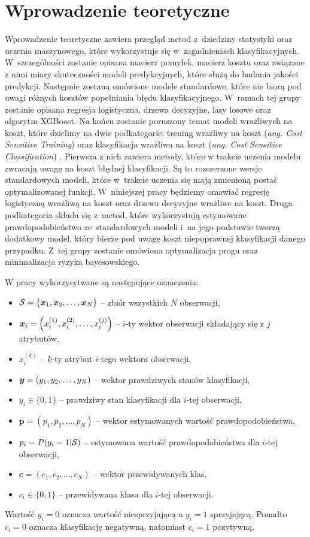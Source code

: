 \documentclass[inzynierska]{pwr_wmat_praca_dyplomowa}
\theoremstyle{plain}
\numberwithin{theorem}{chapter}
\theoremstyle{definition}
\numberwithin{theorem}{chapter}
\begin{document}
\chapter{Wprowadzenie teoretyczne}

Wprowadzenie teoretyczne zawiera przegląd metod z~dziedziny statystyki oraz uczenia maszynowego, które wykorzystuje się w~zagadnieniach klasyfikacyjnych. W~szczególności zostanie opisana macierz pomyłek, macierz kosztu oraz związane z nimi miary skuteczności modeli predykcyjnych, które służą do badania jakości predykcji. Następnie zostaną omówione modele standardowe, które nie biorą pod uwagi różnych kosztów popełniania błędu klasyfikacyjnego. W~ramach tej grupy zostanie opisana regresja logistyczna, drzewa decyzyjne, lasy losowe oraz algorytm XGBoost. Na końcu zostanie poruszony temat modeli wrażliwych na koszt, które dzielimy na dwie podkategorie: trening wrażliwy na koszt (\textit{ang. Cost Sensitive Training}) oraz klasyfikacja wrażliwa na koszt (\textit{ang. Cost Sensitive Classification}) \cite{RMoser}. Pierwsza z nich zawiera metody, które w trakcie uczenia modelu zwracają uwagę na koszt błędnej klasyfikacji. Są to rozszerzone wersje standardowych modeli, które w~trakcie uczenia się mają zmienioną postać optymalizowanej funkcji. W~niniejszej pracy będziemy omawiać regresję logistyczną wrażliwą na koszt oraz drzewa decyzyjne wrażliwe na koszt. Druga podkategoria składa się z~metod, które wykorzystują estymowane prawdopodobieństwo ze~standardowych modeli i~na jego podstawie tworzą dodatkowy model, który bierze pod uwagę koszt niepoprawnej klasyfikacji danego przypadku. Z~tej grupy zostanie omówiona optymalizacja progu oraz minimalizacja ryzyka bayesowskiego.

W pracy wykorzysytwane są następujące oznaczenia:
\begin{itemize}
	\item $\mathcal{S} = \{\boldsymbol{x}_1, \boldsymbol{x}_2, \dots, \boldsymbol{x}_N \}$ -- zbiór wszystkich $N$ obserwacji,
	\item $\boldsymbol{x}_{i} = \left(x_i^{(1)}, x_i^{(2)}, \dots, x_i^{(j)} \right)$ -- $i$-ty wektor obserwacji składający się z $j$ atrybutów,
	\item $x_i^{(k)}$ -- $k$-ty atrybut $i$-tego wektora obserwacji,
	\item $\boldsymbol{y} = (y_1, y_2, \dots, y_N)$ -- wektor prawdziwych stanów klasyfikacji,
	\item $y_i \in \{0,1\}$ -- prawdziwy stan klasyfikacji dla $i$-tej obserwacji,
	\item $\boldsymbol{p} = (p_1, p_2, \dots, p_N)$ -- wektor estymowanych wartość prawdopodobieństwa,
	\item $p_i = P(y_i = 1 | \mathcal{S})$ -- estymowana wartość prawdopodobieństwa dla $i$-tej obserwacji,
	\item $\boldsymbol{c} = (c_1, c_2, \dots, c_N) $ -- wektor przewidywanych klas,
	\item $c_i \in \{0,1\} $ -- przewidywana klasa dla $i$-tej obserwacji.
\end{itemize}
Wartość $y_i = 0$ oznacza wartość niesprzyjającą a $y_i = 1$ sprzyjającą. Ponadto $c_i = 0$ oznacza klasyfikację negatywną, natomiast $c_i = 1$ pozytywną.
\end{document}
